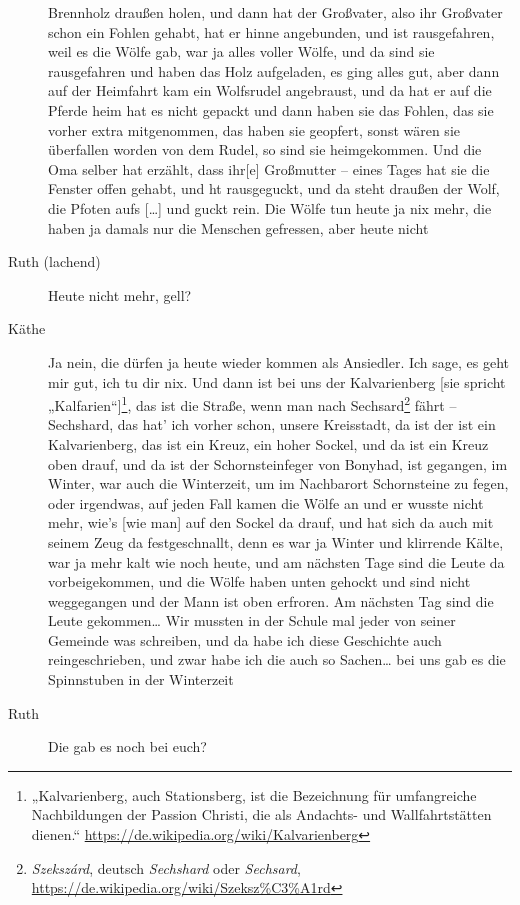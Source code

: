 \documentclass[ngerman,]{article}
\begin{document}
\begin{multicols}{3}
\begin{description}
Brennholz draußen holen, und dann hat der Großvater, also ihr Großvater
schon ein Fohlen gehabt, hat er hinne angebunden, und ist rausgefahren,
weil es die Wölfe gab, war ja alles voller Wölfe, und da sind sie
rausgefahren und haben das Holz aufgeladen, es ging alles gut, aber dann
auf der Heimfahrt kam ein Wolfsrudel angebraust, und da hat er auf die
Pferde heim hat es nicht gepackt und dann haben sie das Fohlen, das sie
vorher extra mitgenommen, das haben sie geopfert, sonst wären sie
überfallen worden von dem Rudel, so sind sie heimgekommen. Und die Oma
selber hat erzählt, dass ihr{[}e{]} Großmutter – eines Tages hat sie die
Fenster offen gehabt, und ht rausgeguckt, und da steht draußen der Wolf,
die Pfoten aufs {[}\ldots{}{]} und guckt rein. Die Wölfe tun heute ja
nix mehr, die haben ja damals nur die Menschen gefressen, aber heute
nicht
\item[Ruth (lachend)]
Heute nicht mehr, gell?
\item[Käthe]
Ja nein, die dürfen ja heute wieder kommen als Ansiedler. Ich sage, es
geht mir gut, ich tu dir nix. Und dann ist bei uns der Kalvarienberg
{[}sie spricht „Kalfarien“{]}\footnote{„Kalvarienberg, auch
  Stationsberg, ist die Bezeichnung für umfangreiche Nachbildungen der
  Passion Christi, die als Andachts- und Wallfahrtstätten dienen.“
  \url{https://de.wikipedia.org/wiki/Kalvarienberg}}, das ist die
Straße, wenn man nach Sechsard\footnote{\emph{Szekszárd}, deutsch
  \emph{Sechshard} oder \emph{Sechsard},
  \url{https://de.wikipedia.org/wiki/Szeksz\%C3\%A1rd}} fährt –
Sechshard, das hat' ich vorher schon, unsere Kreisstadt, da ist der ist
ein Kalvarienberg, das ist ein Kreuz, ein hoher Sockel, und da ist ein
Kreuz oben drauf, und da ist der Schornsteinfeger von Bonyhad, ist
gegangen, im Winter, war auch die Winterzeit, um im Nachbarort
Schornsteine zu fegen, oder irgendwas, auf jeden Fall kamen die Wölfe an
und er wusste nicht mehr, wie's {[}wie man{]} auf den Sockel da drauf,
und hat sich da auch mit seinem Zeug da festgeschnallt, denn es war ja
Winter und klirrende Kälte, war ja mehr kalt wie noch heute, und am
nächsten Tage sind die Leute da vorbeigekommen, und die Wölfe haben
unten gehockt und sind nicht weggegangen und der Mann ist oben erfroren.
Am nächsten Tag sind die Leute gekommen\ldots{} Wir mussten in der
Schule mal jeder von seiner Gemeinde was schreiben, und da habe ich
diese Geschichte auch reingeschrieben, und zwar habe ich die auch so
Sachen\ldots{} bei uns gab es die Spinnstuben in der Winterzeit
\item[Ruth]
Die gab es noch bei euch?

\end{description}
\end{multicols}
\end{document}
